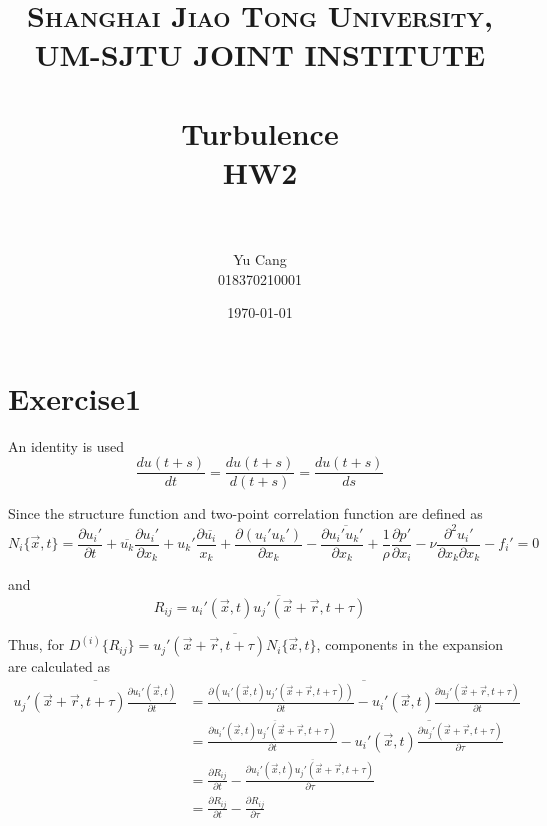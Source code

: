 \documentclass[paper=a4, fontsize=11pt]{scrartcl} %
\title{	
\normalfont \normalsize 
\textsc{Shanghai Jiao Tong University, UM-SJTU JOINT INSTITUTE} \\ [25pt] %
\horrule{0.5pt} \\[0.4cm] %
\huge Turbulence \\ HW2 \\ %
\horrule{2pt} \\[0.5cm] %
}
\author{Yu Cang \\ 018370210001}
\date{\normalsize \today}
\numberwithin{equation}{section} %
\numberwithin{figure}{section} %
\numberwithin{table}{section} %
\begin{document}
\maketitle

\section{Exercise1}
	An identity is used
	\begin{equation}
		\frac{d u(t+s)}{dt} = \frac{d u(t+s)}{d(t+s)} = \frac{d u(t+s)}{ds} 
	\end{equation}
	
	Since the structure function and two-point correlation function are defined as
	\begin{equation}
		N_i\{\vec{x}, t\} = \frac{\partial u_i'}{\partial t} + \overline{u_k}\frac{\partial u_i'}{\partial x_k} + u_k' \frac{\partial \overline{u_i}}{x_k} + \frac{\partial (u_i' u_k')}{\partial x_k} - \frac{\partial \overline{u_i' u_k'}}{\partial x_k} + \frac{1}{\rho} \frac{\partial p'}{\partial x_i}-\nu \frac{\partial^2 u_i'}{\partial x_k \partial x_k} - f_i' = 0
	\end{equation}
	
	and
	\begin{equation}
		R_{ij} = \overline{u_i'(\vec{x}, t) u_j'(\vec{x}+\vec{r}, t + \tau)}
	\end{equation}

	Thus, for $D^{(i)}\{R_{ij}\} = \overline{u_j'(\vec{x} + \vec{r}, t+\tau) N_i\{\vec{x}, t\}}$, components in the expansion are calculated as
	\begin{equation}
		\begin{aligned}
			\overline{u_j'(\vec{x} + \vec{r}, t+\tau) \frac{\partial u_i'(\vec{x}, t)}{\partial t}}  
			& = \overline{\frac{\partial (u_i'(\vec{x}, t)u_j'(\vec{x} + \vec{r}, t+\tau))}{\partial t} - u_i'(\vec{x}, t) \frac{\partial u_j'(\vec{x} + \vec{r}, t+\tau)}{\partial t}}\\
			& = \frac{\partial \overline{u_i'(\vec{x}, t)u_j'(\vec{x} + \vec{r}, t+\tau)}}{\partial t} - \overline{u_i'(\vec{x}, t) \frac{\partial u_j'(\vec{x} + \vec{r}, t+\tau)}{\partial \tau}}\\
			& = \frac{\partial R_{ij}}{\partial t} - \frac{\partial \overline{u_i'(\vec{x}, t) u_j'(\vec{x} + \vec{r}, t+\tau)}}{\partial \tau}\\
			& = \frac{\partial R_{ij}}{\partial t} - \frac{\partial R_{ij}}{\partial \tau}
		\end{aligned}
	\end{equation} 
	
\end{document}
